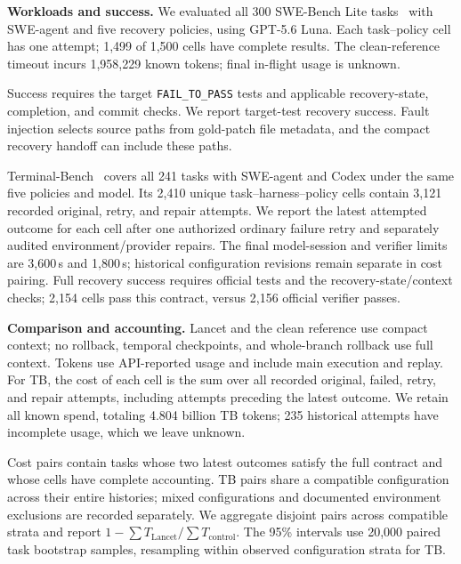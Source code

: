\textbf{Workloads and success.}
We evaluated all 300 SWE-Bench Lite tasks~\cite{swebench} with SWE-agent and
five recovery policies, using GPT-5.6 Luna.
Each task--policy cell has one attempt; 1,499 of 1,500 cells have complete
results.
The clean-reference timeout incurs 1,958,229 known tokens; final in-flight
usage is unknown.

Success requires the target \texttt{FAIL\_TO\_PASS} tests and applicable
recovery-state, completion, and commit checks.
We report target-test recovery success. Fault injection selects source paths
from gold-patch file metadata, and the compact recovery handoff can include
these paths.

Terminal-Bench~\cite{tbench} covers all 241 tasks with SWE-agent and Codex under the same
five policies and model.
Its 2,410 unique task--harness--policy cells contain 3,121 recorded original,
retry, and repair attempts.
We report the latest attempted outcome for each cell after one authorized ordinary
failure retry and separately audited environment/provider repairs.
The final model-session and verifier limits are 3,600\,s and 1,800\,s;
historical configuration revisions remain separate in cost pairing.
Full recovery success requires official tests and the recovery-state/context
checks; 2,154 cells pass this contract, versus 2,156 official verifier passes.

\textbf{Comparison and accounting.}
Lancet and the clean reference use compact context;
no rollback, temporal checkpoints, and whole-branch rollback use full context.
Tokens use API-reported usage and include main execution and replay.
For TB, the cost of each cell is the sum over all recorded original, failed,
retry, and repair attempts, including attempts preceding the latest outcome.
We retain all known spend, totaling 4.804 billion TB tokens; 235 historical
attempts have incomplete usage, which we leave unknown.

Cost pairs contain tasks whose two latest outcomes satisfy the full
contract and whose cells have complete accounting.
TB pairs share a compatible configuration across their entire histories;
mixed configurations and documented environment exclusions are recorded
separately.
We aggregate disjoint pairs across compatible strata and report
$1-\sum T_{\mathrm{Lancet}}/\sum T_{\mathrm{control}}$.
The 95\% intervals use 20,000 paired task bootstrap samples, resampling within
observed configuration strata for TB.


